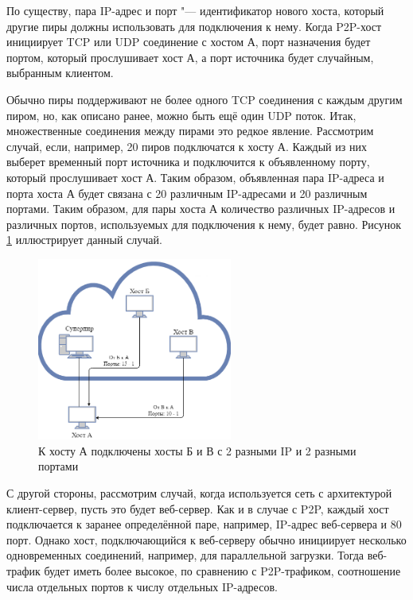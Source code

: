 \documentclass[bachelor, och, coursework]{SCWorks}
\begin{document}
По существу, пара IP-адрес и порт "--- идентификатор нового хоста, который другие пиры должны использовать для подключения к нему. Когда P2P-хост инициирует TCP или UDP соединение с хостом А, порт назначения будет портом, который прослушивает хост А, а порт источника будет случайным, выбранным клиентом. 

Обычно пиры поддерживают не более одного TCP соединения с каждым другим пиром, но, как описано ранее, можно быть ещё один UDP поток. Итак, множественные соединения между пирами это редкое явление. Рассмотрим случай, если, например, 20 пиров подключатся к хосту А. Каждый из них выберет временный порт источника и подключится к объявленному порту, который прослушивает хост А. Таким образом, объявленная пара IP-адреса и порта хоста А будет связана с 20 различным IP-адресами и 20 различным портами. Таким образом, для пары хоста А количество различных IP-адресов и различных портов, используемых для подключения к нему, будет равно. Рисунок \ref{IPPort3.png} иллюстрирует данный случай.

\begin{figure}[H]
    \centering
    \includegraphics[width=0.57\textwidth]{IPPort3.png}
    \caption{К хосту А подключены хосты Б и В с 2 разными IP и 2 разными портами}
    \label{IPPort3.png}
\end{figure}

С другой стороны, рассмотрим случай, когда используется сеть с архитектурой клиент-сервер, пусть это будет веб-сервер. Как и в случае с P2P, каждый хост подключается к заранее определённой паре, например, IP-адрес веб-сервера и 80 порт. Однако хост, подключающийся к веб-серверу обычно инициирует несколько одновременных соединений, например, для параллельной загрузки. Тогда веб-трафик будет иметь более высокое, по сравнению с P2P-трафиком, соотношение числа отдельных портов к числу отдельных IP-адресов.
\end{document}

